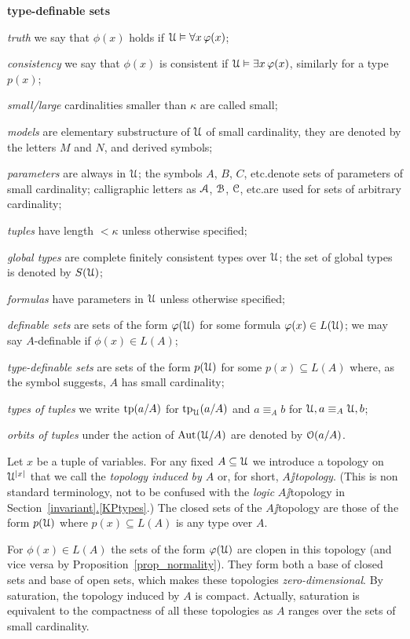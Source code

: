 \documentclass[creche.tex]{subfiles}
\begin{document}
\begin{litemize}{{\bf type-definable sets}}
\item[\emph{truth}] we say that $\phi(x)$ holds if $\EuScript U\vDash\forall x\,\varphi(x)$;
\item[\emph{consistency}] we say that $\phi(x)$ is consistent if $\EuScript U\vDash\exists x\,\varphi(x)$, similarly for a type $p(x)$;
\item[\emph{small/large}] cardinalities smaller than $\kappa$ are called small; 
\item[\emph{models}] are elementary substructure of $\EuScript U$ of small cardinality, they are denoted by the letters $M$ and $N$, and derived symbols;
\item[\emph{parameters}] are always in $\EuScript U$; the symbols $A$, $B$, $C$, etc.\@ denote sets of parameters of small cardinality; calligraphic letters as $\EuScript A$, $\EuScript B$, $\EuScript C$, etc.\@ are used for sets of arbitrary cardinality;
\item[\emph{tuples}]  have length $<\kappa$ unless otherwise specified;
\item[\emph{global types}] are complete finitely consistent types over $\EuScript U$; the set of global types is denoted by $S(\EuScript U)$;
\item[\emph{formulas}] have parameters in $\EuScript U$ unless otherwise specified;
\item[\emph{definable sets}] are sets of the form $\varphi(\EuScript U)$ for some formula $\varphi(x)\in L(\EuScript U)$; we may say $A$-definable if $\phi(x)\in L(A)$;
\item[\emph{type-definable sets}] are sets of the form $p(\EuScript U)$ for some $p(x)\subseteq L(A)$ where, as the symbol suggests, $A$ has small cardinality;
\item[\emph{types of tuples}] we write ${\rm tp}(a/A)$ for ${\rm tp}_\EuScript U(a/A)$ and $a\equiv_A b$ for $\EuScript U,a \equiv_A \EuScript U,b$; 
\item[\emph{orbits of tuples}] under the action of $\textrm{Aut\kern.15ex}(\EuScript U/A)$ are denoted by $\EuScript O(a/A)$.
\end{litemize}


Let $x$ be a tuple of variables. For any fixed $A\subseteq \EuScript U$ we introduce a topology on $\EuScript U^{|x|}$ that we call the \emph{topology induced by $A$} or, for short, \emph{$A\jj$topology}. (This is non standard terminology, not to be confused with the \textit{logic\/} $A\jj$topology in Section~\hyperref[invariant]{\ref*{invariant}.\ref*{KPtypes}}.) The closed sets of the $A\jj$topology are those of the form $p(\EuScript U)$ where $p(x)\subseteq L(A)$ is any type over $A$.

For $\phi(x)\in L(A)$ the sets of the form $\varphi(\EuScript U)$ are clopen in this topology (and vice versa by Proposition~\ref{prop_normality}). They form both a base of closed sets and base of open sets, which makes these topologies \textit{zero-dimensional}. By saturation, the topology induced by $A$ is compact. Actually, saturation is equivalent to the compactness of all these topologies as $A$ ranges over the sets of small cardinality.
\end{document}
